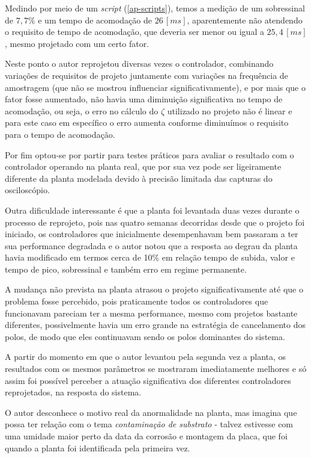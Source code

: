 \documentclass[
	12pt,				%
	article,			%
	openright,			%
	oneside,
	a4paper,			%
	chapter=TITLE,		%
	section=TITLE,		%
	english,			%
	french,				%
	spanish,			%
	brazil,				%
]{abntex2}
\begin{document}
                Medindo por meio de um \textit{script} (\autoref{ap-scripts}), temos a medição de um sobressinal de $7,7\%$ e um tempo de acomodação de $26\,[ms]$, aparentemente não atendendo o requisito de tempo de acomodação, que deveria ser menor ou igual a $25,4\,[ms]$, mesmo projetado com um certo fator.
                
                Neste ponto o autor reprojetou diversas vezes o controlador, combinando variações de requisitos de projeto juntamente com variações na frequência de amostragem (que não se mostrou influenciar significativamente), e por mais que o fator fosse aumentado, não havia uma diminuição significativa no tempo de acomodação, ou seja, o erro no cálculo do $\zeta$ utilizado no projeto não é linear e para este caso em específico o erro aumenta conforme diminuímos o requisito para o tempo de acomodação.
                
                Por fim optou-se por partir para testes práticos para avaliar o resultado com o controlador operando na planta real, que por sua vez pode ser ligeiramente diferente da planta modelada devido à precisão limitada das capturas do osciloscópio.
                
                Outra dificuldade interessante é que a planta foi levantada duas vezes durante o processo de reprojeto, pois nas quatro semanas decorridas desde que o projeto foi iniciado, os controladores que inicialmente desempenhavam bem passaram a ter sua performance degradada e o autor notou que a resposta ao degrau da planta havia modificado em termos cerca de 10\% em relação tempo de subida, valor e tempo de pico, sobressinal e também erro em regime permanente. 
                
                A mudança não prevista na planta atrasou o projeto significativamente até que o problema fosse percebido, pois praticamente todos os controladores que funcionavam pareciam ter a mesma performance, mesmo com projetos bastante diferentes, possivelmente havia um erro grande na estratégia de cancelamento dos polos, de modo que eles continuavam sendo os polos dominantes do sistema.
                
                A partir do momento em que o autor levantou pela segunda vez a planta, os resultados com os mesmos parâmetros se mostraram imediatamente melhores e só assim foi possível perceber a atuação significativa dos diferentes controladores reprojetados, na resposta do sistema.
            
                O autor desconhece o motivo real da anormalidade na planta, mas imagina que possa ter relação com o tema \textit{contaminação de substrato} - talvez estivesse com uma umidade maior perto da data da corrosão e montagem da placa, que foi quando a planta foi identificada pela primeira vez.
        
\end{document}
